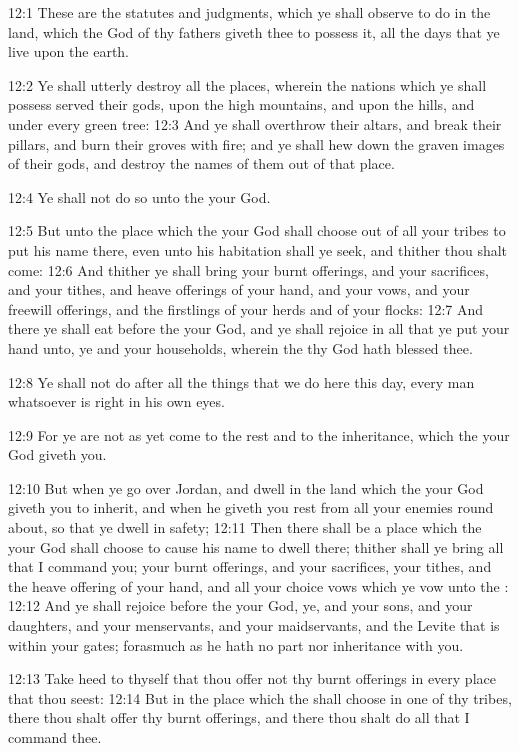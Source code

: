 12:1 These are the statutes and judgments, which ye shall observe to
do in the land, which the \LORD God of thy fathers giveth thee to
possess it, all the days that ye live upon the earth.

12:2 Ye shall utterly destroy all the places, wherein the nations
which ye shall possess served their gods, upon the high mountains, and
upon the hills, and under every green tree: 12:3 And ye shall
overthrow their altars, and break their pillars, and burn their groves
with fire; and ye shall hew down the graven images of their gods, and
destroy the names of them out of that place.

12:4 Ye shall not do so unto the \LORD your God.

12:5 But unto the place which the \LORD your God shall choose out of
all your tribes to put his name there, even unto his habitation shall
ye seek, and thither thou shalt come: 12:6 And thither ye shall bring
your burnt offerings, and your sacrifices, and your tithes, and heave
offerings of your hand, and your vows, and your freewill offerings,
and the firstlings of your herds and of your flocks: 12:7 And there ye
shall eat before the \LORD your God, and ye shall rejoice in all that
ye put your hand unto, ye and your households, wherein the \LORD thy
God hath blessed thee.

12:8 Ye shall not do after all the things that we do here this day,
every man whatsoever is right in his own eyes.

12:9 For ye are not as yet come to the rest and to the inheritance,
which the \LORD your God giveth you.

12:10 But when ye go over Jordan, and dwell in the land which the \LORD
your God giveth you to inherit, and when he giveth you rest from all
your enemies round about, so that ye dwell in safety; 12:11 Then there
shall be a place which the \LORD your God shall choose to cause his
name to dwell there; thither shall ye bring all that I command you;
your burnt offerings, and your sacrifices, your tithes, and the heave
offering of your hand, and all your choice vows which ye vow unto the
\LORD: 12:12 And ye shall rejoice before the \LORD your God, ye, and
your sons, and your daughters, and your menservants, and your
maidservants, and the Levite that is within your gates; forasmuch as
he hath no part nor inheritance with you.

12:13 Take heed to thyself that thou offer not thy burnt offerings in
every place that thou seest: 12:14 But in the place which the \LORD
shall choose in one of thy tribes, there thou shalt offer thy burnt
offerings, and there thou shalt do all that I command thee.

